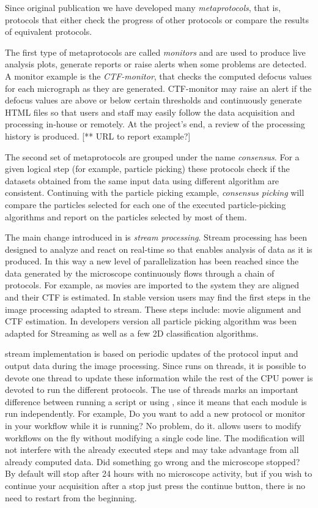 Since \scipion original publication we have developed many \emph{metaprotocols}, that is, 
protocols that either check the progress of other protocols or compare the results of equivalent protocols.

The first type of metaprotocols are called \emph{monitors} and are used to produce live analysis plots, generate reports or raise alerts when some problems are detected. A monitor example is the \emph{CTF-monitor}, that checks the computed defocus values for
each micrograph as they are generated. CTF-monitor may raise an alert if the defocus values are above or below certain thresholds and continuously generate HTML files so that users and staff may easily follow the data acquisition and processing in-house or remotely. At the project's end, a review of the processing history is produced. [** URL to report example?]

The second set of metaprotocols are grouped under the name \emph{consensus}. For a given logical step (for example, particle picking) these protocols check if the datasets obtained from the same input data using different algorithm are consistent. Continuing with the particle picking example, \emph{consensus picking} will compare the particles selected for each one of the executed particle-picking algorithms and report on the particles selected by most of them.

The main change introduced in \scipion is \emph{stream processing}. Stream processing has been designed to analyze and react on real-time so that enables analysis of data as it is produced.
In this way a new level of parallelization has been reached since the  data generated by the microscope continuously flows through a chain of protocols. For example, as movies are imported to the system they are aligned and their CTF is estimated. In \scipion stable version users may find  the first steps in the image processing adapted to stream. These steps include: movie alignment and CTF estimation. In \scipion developers version all particle picking algorithm was been adapted for Streaming as well as a few 2D classification algorithms.

\scipion stream implementation is based on periodic updates of the protocol input and output data during the image processing. Since \scipion runs on threads, it is possible to devote one thread to update these information while the rest of the CPU power is devoted to run the different protocols. The use of threads marks an important difference between running a script or using \scipion, since it means that each module is run independently. For example, Do you want to add a new protocol or monitor in your workflow while it is running? No problem, do it. \scipion allows users to modify  workflows on the fly without modifying a single code line. The modification will not interfere with the already executed steps and may take advantage from all already computed data. Did something go wrong and the microscope stopped? By default \scipion will stop after 24 hours with no microscope activity, but if you wish to continue your acquisition after a stop just press the continue button, there is no need to restart from the beginning. 

